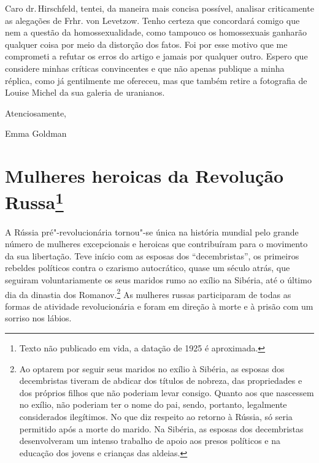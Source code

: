 Caro dr.\,Hirschfeld, tentei, da maneira mais concisa possível, analisar
criticamente as alegações de Frhr. von Levetzow. Tenho certeza que
concordará comigo que nem a questão da homossexualidade, como tampouco
os homossexuais ganharão qualquer coisa por meio da distorção dos fatos.
Foi por esse motivo que me comprometi a refutar os erros do artigo e
jamais por qualquer outro. Espero que considere minhas críticas
convincentes e que não apenas publique a minha réplica, como já
gentilmente me ofereceu, mas que também retire a fotografia de Louise
Michel da sua galeria de uranianos.

Atenciosamente,

Emma Goldman

\chapter{Mulheres heroicas da Revolução Russa\footnote[*]{Texto não publicado em
  vida, a datação de 1925 é aproximada.}}

A Rússia pré"-revolucionária tornou"-se única na história mundial pelo
grande número de mulheres excepcionais e heroicas que contribuíram para
o movimento da sua libertação. Teve início com as esposas dos
``decembristas'', os primeiros rebeldes políticos contra o czarismo
autocrático, quase um século atrás, que seguiram voluntariamente os
seus maridos rumo ao exílio na Sibéria, até o último dia da dinastia dos
Romanov.\footnote{Ao optarem por seguir seus maridos no exílio à
  Sibéria, as esposas dos decembristas tiveram de abdicar dos títulos de
  nobreza, das propriedades e dos próprios filhos que não poderiam levar consigo. Quanto aos que nascessem no exílio, não poderiam ter o nome do
  pai, sendo, portanto, legalmente considerados ilegítimos. No que diz respeito ao retorno à Rússia, só seria permitido
  após a morte do marido. Na Sibéria, as esposas dos decembristas desenvolveram um intenso trabalho de apoio aos presos políticos e na educação dos jovens e crianças das
  aldeias.} As mulheres russas participaram de todas as formas de
atividade revolucionária e foram em direção à morte e à prisão com um
sorriso nos lábios.

